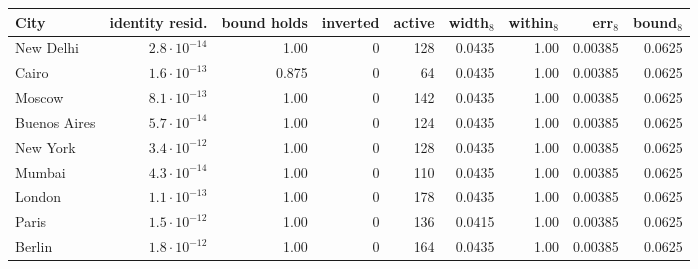 \begin{tabular}{lrrrrrrrr}
\toprule
City & identity resid. & bound holds & inverted & active & width$_8$ & within$_8$ & err$_8$ & bound$_8$ \\
\midrule
New Delhi & $2.8\cdot10^{-14}$ & 1.00 & 0 & 128 & 0.0435 & 1.00 & 0.00385 & 0.0625 \\
Cairo & $1.6\cdot10^{-13}$ & 0.875 & 0 & 64 & 0.0435 & 1.00 & 0.00385 & 0.0625 \\
Moscow & $8.1\cdot10^{-13}$ & 1.00 & 0 & 142 & 0.0435 & 1.00 & 0.00385 & 0.0625 \\
Buenos Aires & $5.7\cdot10^{-14}$ & 1.00 & 0 & 124 & 0.0435 & 1.00 & 0.00385 & 0.0625 \\
New York & $3.4\cdot10^{-12}$ & 1.00 & 0 & 128 & 0.0435 & 1.00 & 0.00385 & 0.0625 \\
Mumbai & $4.3\cdot10^{-14}$ & 1.00 & 0 & 110 & 0.0435 & 1.00 & 0.00385 & 0.0625 \\
London & $1.1\cdot10^{-13}$ & 1.00 & 0 & 178 & 0.0435 & 1.00 & 0.00385 & 0.0625 \\
Paris & $1.5\cdot10^{-12}$ & 1.00 & 0 & 136 & 0.0415 & 1.00 & 0.00385 & 0.0625 \\
Berlin & $1.8\cdot10^{-12}$ & 1.00 & 0 & 164 & 0.0435 & 1.00 & 0.00385 & 0.0625 \\
\bottomrule
\end{tabular}
